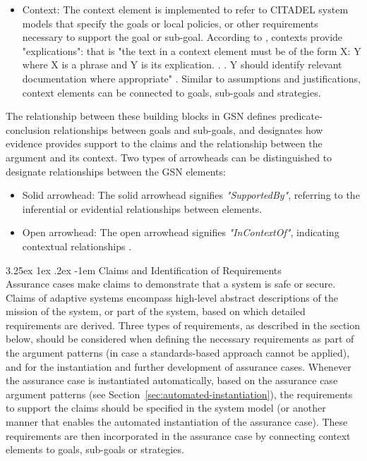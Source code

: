 \documentclass[12pt,twoside,a4paper]{article}
\makeatletter
\renewcommand\paragraph{\@startsection{paragraph}{5}{\z@}%
  {3.25ex \@plus1ex \@minus.2ex}%
  {-1em}%
  {\normalfont\normalsize\bfseries}}
\makeatother
\begin{document}
\begin{itemize}
	\item Context: The context element is implemented to refer to CITADEL system models that specify the goals or local policies, or other requirements necessary to support the goal or sub-goal. According to \cite{Rushby15understanding-and-evaluating}, contexts provide "explications": that is "the text in a context element must be of the form X: Y where X is a phrase and Y is its explication. . . Y should identify relevant documentation where appropriate" \cite{GSN_standard}. Similar to assumptions and justifications, context elements can be connected to goals, sub-goals and strategies.
	\end{itemize}
The relationship between these building blocks in GSN defines predicate-conclusion relationships between goals and sub-goals, and designates how evidence provides support to the claims and the relationship between the argument and its context. Two types of arrowheads can be distinguished to designate relationships between the GSN elements: 
	\begin{itemize}
	\item Solid arrowhead: The solid arrowhead signifies \textit{"SupportedBy"}, referring to the inferential or evidential relationships between elements.
	\item Open arrowhead: The open arrowhead signifies \textit{"InContextOf"}, indicating contextual relationships \cite{GSN_standard}.
	\end{itemize}


\paragraph{Claims and Identification of Requirements}
~\\
Assurance cases make claims to demonstrate that a system is safe or secure. Claims of adaptive systems encompass high-level abstract descriptions of the mission of the system, or part of the system, based on which detailed requirements are derived. 
Three types of requirements, as described in the section below, should be considered when defining the necessary requirements as part of the argument patterns (in case a standards-based approach cannot be applied), and for the instantiation and further development of assurance cases. Whenever the assurance case is instantiated automatically, based on the assurance case argument patterns (see Section~\ref{sec:automated-instantiation}), the requirements to support the claims should be specified in the system model (or another manner that enables the automated instantiation of the assurance case). These requirements are then incorporated in the assurance case by connecting context elements to goals, sub-goals or strategies. 
\end{document}
